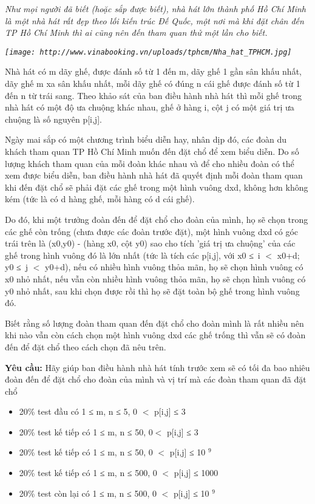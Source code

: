 \emph{    Như mọi người đã biết (hoặc sắp được biết), nhà hát lớn thành phố Hồ Chí Minh là một nhà hát rất đẹp theo lối kiến trúc Đế Quốc, một nơi mà khi đặt chân đến TP Hồ Chí Minh thì ai cũng nên đến tham quan thử một lần cho biết.   }

\emph{
\texttt{[image: http://www.vinabooking.vn/uploads/tphcm/Nha\_hat\_TPHCM.jpg]}}

   Nhà hát có m dãy ghế, được đánh số từ 1 đến m, dãy ghế 1 gần sân khấu nhất, dãy ghế m xa sân khấu nhất, mỗi dãy ghế có đúng n cái ghế được đánh số từ 1 đến n từ trái sang. Theo khảo sát của ban điều hành nhà hát thì mỗi ghế trong nhà hát có một độ ưa chuộng khác nhau, ghế ở hàng i, cột j có một giá trị ưa chuộng là số nguyên p[i,j].  

   Ngày mai sắp có một chương trình biểu diễn hay, nhân dịp đó, các đoàn du khách tham quan TP Hồ Chí Minh muốn đến đặt chổ để xem biểu diễn. Do số lượng khách tham quan của mỗi đoàn khác nhau và để cho nhiều đoàn có thể xem được biểu diễn, ban điều hành nhà hát đã quyết định mỗi đoàn tham quan khi đến đặt chổ sẽ phải đặt các ghế trong một hình vuông dxd, không hơn không kém (tức là có d hàng ghế, mỗi hàng có d cái ghế).  

   Do đó, khi một trưởng đoàn đến để đặt chổ cho đoàn của mình, họ sẽ chọn trong các ghế còn trống (chưa được các đoàn trước đặt), một hình vuông dxd có góc trái trên là (x0,y0) - (hàng x0, cột y0) sao cho tích 'giá trị ưa chuộng' của các ghế trong hình vuông đó là lớn nhất (tức là tích các p[i,j], với x0 ≤ i $<$ x0+d; y0 ≤ j $<$ y0+d), nếu có nhiều hình vuông thỏa mãn, họ sẽ chọn hình vuông có x0 nhỏ nhất, nếu vẫn còn nhiều hình vuông thỏa mãn, họ sẽ chọn hình vuông có y0 nhỏ nhất, sau khi chọn được rồi thì họ sẽ đặt toàn bộ ghế trong hình vuông đó.  

   Biết rằng số lượng đoàn tham quan đến đặt chổ cho đoàn mình là rất nhiều nên khi nào vẫn còn cách chọn một hình vuông dxd các ghế trống thì vẫn sẽ có đoàn đến để đặt chổ theo cách chọn đã nêu trên.  

\textbf{    Yêu cầu:   }   Hãy giúp ban điều hành nhà hát tính trước xem sẽ có tối đa bao nhiêu đoàn đến để đặt chổ cho đoàn của mình và vị trí mà các đoàn tham quan đã đặt chổ  

\begin{itemize}
	\item     20\% test đầu có 1 ≤ m, n ≤ 5, 0 $<$ p[i,j] ≤ 3   
	\item     20\% test kế tiếp có 1 ≤ m, n ≤ 50, 0$<$ p[i,j] ≤ 3   
	\item     20\% test kế tiếp có 1 ≤ m, n ≤ 50, 0 $<$ p[i,j] ≤ 10    $^     9    $
	\item     20\% test kế tiếp có 1 ≤ m, n ≤ 500, 0 $<$ p[i,j] ≤ 1000   
	\item     20\% test còn lại có 1 ≤ m, n ≤ 500, 0 $<$ p[i,j] ≤ 10    $^     9    $
\end{itemize}